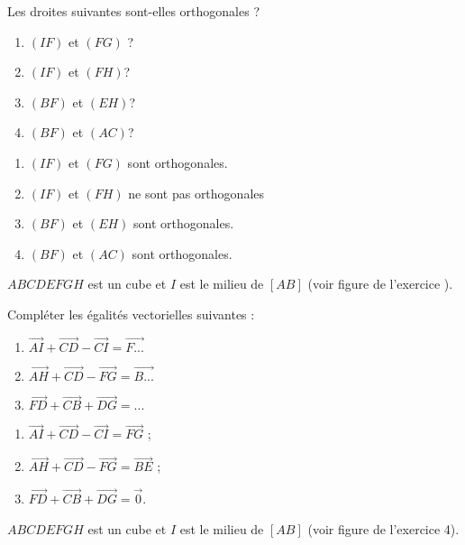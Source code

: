 \begin{colonne*exercice}
\begin{exercice*}
  Les droites suivantes sont-elles orthogonales ?
  \begin{enumerate}
  \item $(IF)$ et $(FG)$ ?
  \item $(IF)$ et $(FH)$?
  \item $(BF)$ et $(EH)$?
  \item $(BF)$ et $(AC)$?
  \end{enumerate}
\end{exercice*}
\begin{corrige}
  \begin{enumerate}
\item  $(IF)$ et $(FG)$ sont orthogonales.
\item  $(IF)$ et $(FH)$ ne sont pas orthogonales
\item  $(BF)$ et $(EH)$ sont orthogonales.
\item  $(BF)$ et $(AC)$ sont orthogonales.
\end{enumerate}
\end{corrige}

\begin{exercice*}
  $ABCDEFGH$ est un cube et $I$ est le milieu de $[AB]$ (voir figure
  de l'exercice ).

  Compléter les égalités vectorielles suivantes :
  \begin{enumerate}
  \item
    $\overrightarrow{AI}+\overrightarrow{CD}-\overrightarrow{CI}=\overrightarrow{F...}$
  \item
    $\overrightarrow{AH}+\overrightarrow{CD}-\overrightarrow{FG}=\overrightarrow{B...}$
  \item
    $\overrightarrow{FD}+\overrightarrow{CB}+\overrightarrow{DG} =...$
  \end{enumerate}
\end{exercice*}
\begin{corrige}
  \begin{enumerate}
\item  $\overrightarrow{AI}+\overrightarrow{CD}-\overrightarrow{CI}=\overrightarrow{FG}$ ;
\item $\overrightarrow{AH}+\overrightarrow{CD}-\overrightarrow{FG}=\overrightarrow{BE}$ ;
\item $\overrightarrow{FD}+\overrightarrow{CB}+\overrightarrow{DG} =\overrightarrow{0}$.
 \end{enumerate}
\end{corrige}

\begin{exercice*}
  $ABCDEFGH$ est un cube et $I$ est le milieu de $[AB]$ (voir figure
  de l'exercice 4).


\end{exercice*}
\end{colonne*exercice}
